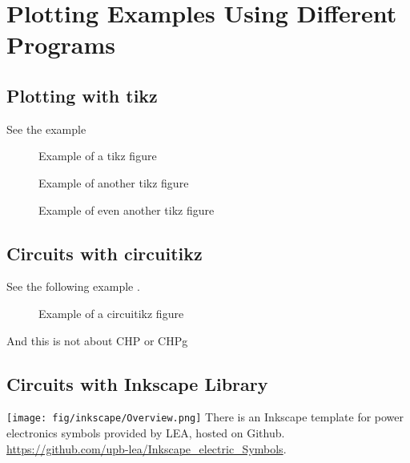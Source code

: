 \chapter{Plotting Examples Using Different Programs} 
\label{cha:evaluation}

\section{Plotting with tikz}

See the example 
\begin{figure}[ht]
    \centering
    
    \caption{Example of a tikz figure}
    \label{fig:tikz_example_01}
\end{figure}
\begin{figure}[ht]
    \centering
    
    \caption{Example of another tikz figure}
    \label{fig:tikz_example_02}
\end{figure}
\begin{figure}[ht]
    \centering
    
    \caption{Example of even another tikz figure}
    \label{fig:tikz_example_03}
\end{figure}



\section{Circuits with circuitikz}
See the following example .
\begin{figure}[ht]
    \centering
    
    \caption{Example of a circuitikz figure}
    \label{fig:circuitikz_example}
\end{figure}


And this is not about \acrshort{CHP} or \gls{CHPg}

\section{Circuits with Inkscape Library}
\texttt{[image: fig/inkscape/Overview.png]}
There is an Inkscape template for power electronics symbols provided by LEA, hosted on Github. \href{https://github.com/upb-lea/Inkscape_electric_Symbols}{https://github.com/upb-lea/Inkscape\_electric\_Symbols}.

